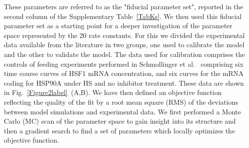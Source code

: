 \documentclass[oneside, 10pt, a4paper, twocolumn]{article}
\begin{document}
These parameters are referred to as the "fiducial parameter set", reported in the second column of the Supplementary Table~\ref{TabKs}.
We then used this fiducial parameter set as a starting point for a
deeper investigation {of the parameter space represented by the 20 rate constants.} For this we divided the experimental data available from the literature in two
groups, one used to calibrate the model and the other to validate the model. The  data used for calibration comprises the controls of feeding
experiments performed in Schmollinger et al.~\cite{Schmollinger2013} {comprising} six time course curves
of HSF1 mRNA concentration, and six curves for the mRNA coding for HSP90A under HS and no inhibitor treatment. These data are shown in Fig.~\ref{Figure2label}~(A,B). 
We have then defined an objective function reflecting the quality of the fit by
a root mean square (RMS) of the deviations between model simulations and experimental 
data. We  first performed a
Monte Carlo (MC) scan of the parameter space to gain insight into its
structure and then a gradient search to find a set of parameters which
locally optimizes the objective function. 
\end{document}
